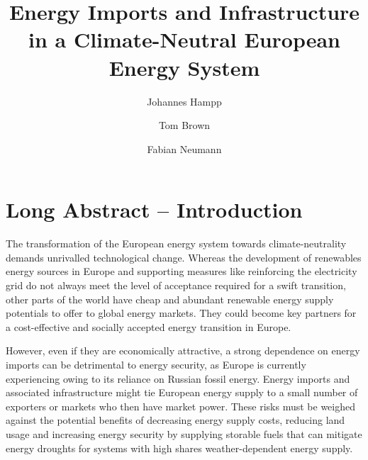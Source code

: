 \documentclass[10pt,5p,reversenotenum,lefttitle]{elsarticle}
\begin{document}
\begin{frontmatter}

	\title{Energy Imports and Infrastructure in a Climate-Neutral European Energy System}
    
	\author[jlu]{Johannes Hampp}
    \author[tub]{Tom Brown}
	\author[tub]{Fabian Neumann}
	\address[jlu]{Center for International Development and Environmental Research, Justus-Liebig-University Gießen, Gießen, Germany}
	\address[tub]{Department of Digital Transformation in Energy Systems, Institute of Energy Technology, Technische Universität Berlin, Fakultät III, Einsteinufer 25 (TA 8), 10587 Berlin, Germany}

\end{frontmatter}

\section*{Long Abstract -- Introduction}

The transformation of the European energy system towards climate-neutrality
demands unrivalled technological change. Whereas the development of renewables
energy sources in Europe and supporting measures like reinforcing the
electricity grid do not always meet the level of acceptance required for a swift
transition, other parts of the world have cheap and abundant renewable energy
supply potentials to offer to global energy
markets.\cite{irenaGlobalHydrogen2022,luxSupplyCurves2021,vanderzwaanTimmermansDream2021,fasihiLongTermHydrocarbon2017,reichenbergDeepDecarbonization2022,galvanExportingSunshine2022,armijoFlexibleProduction2020,pfennigGlobalGISbased2022}
They could become key partners for a cost-effective and socially accepted energy
transition in Europe.

However, even if they are economically attractive, a strong dependence on energy
imports can be detrimental to energy security, as Europe is currently
experiencing owing to its reliance on Russian fossil
energy.\cite{pedersenLongtermImplications2022} Energy imports and associated
infrastructure might tie European energy supply to a small number of exporters
or markets who then have market power. These risks must be weighed against the
potential benefits of decreasing energy supply costs, reducing land usage and
increasing energy security by supplying storable fuels that can mitigate energy
droughts for systems with high shares weather-dependent energy supply.
\end{document}
